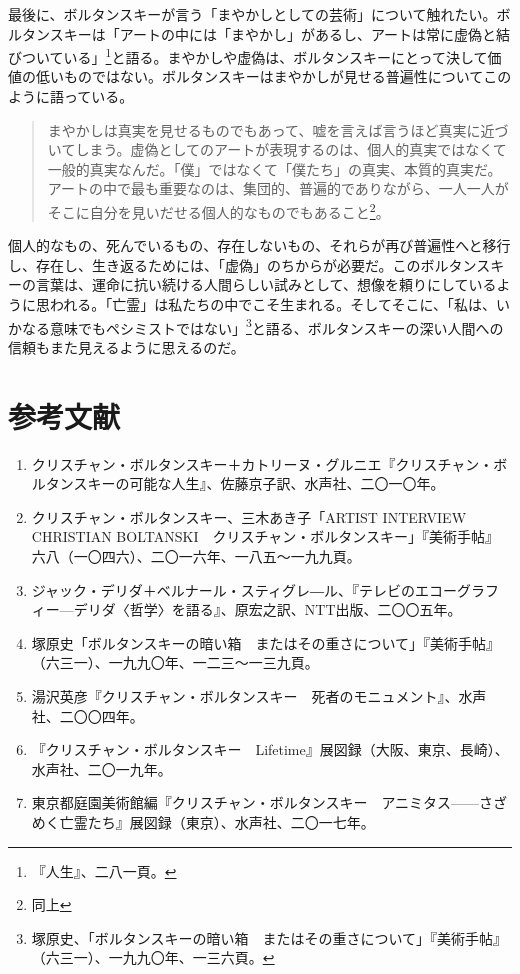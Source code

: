 \documentclass[b5j,twoside,twocolumn]{utarticle}
\begin{document}
最後に、ボルタンスキーが言う「まやかしとしての芸術」について触れたい。ボルタンスキーは「アートの中には「まやかし」があるし、アートは常に虚偽と結びついている」\footnote{『人生』、二八一頁。}と語る。まやかしや虚偽は、ボルタンスキーにとって決して価値の低いものではない。ボルタンスキーはまやかしが見せる普遍性についてこのように語っている。
\begin{quote}
まやかしは真実を見せるものでもあって、嘘を言えば言うほど真実に近づいてしまう。虚偽としてのアートが表現するのは、個人的真実ではなくて一般的真実なんだ。「僕」ではなくて「僕たち」の真実、本質的真実だ。アートの中で最も重要なのは、集団的、普遍的でありながら、一人一人がそこに自分を見いだせる個人的なものでもあること\footnote{同上}。
\end{quote}


個人的なもの、死んでいるもの、存在しないもの、それらが再び普遍性へと移行し、存在し、生き返るためには、「虚偽」のちからが必要だ。このボルタンスキーの言葉は、運命に抗い続ける人間らしい試みとして、想像を頼りにしているように思われる。「亡霊」は私たちの中でこそ生まれる。そしてそこに、「私は、いかなる意味でもペシミストではない」\footnote{塚原史、「ボルタンスキーの暗い箱　またはその重さについて」『美術手帖』（六三一）、一九九〇年、一三六頁。}と語る、ボルタンスキーの深い人間への信頼もまた見えるように思えるのだ。

\clearpage
{\small
\section*{参考文献}
\renewcommand{\labelenumi}{\pbox<y>{[\arabic{enumi}]}}
\begin{enumerate}
\item クリスチャン・ボルタンスキー＋カトリーヌ・グルニエ『クリスチャン・ボルタンスキーの可能な人生』、佐藤京子訳、水声社、二〇一〇年。
\item クリスチャン・ボルタンスキー、三木あき子「ARTIST INTERVIEW CHRISTIAN BOLTANSKI　クリスチャン・ボルタンスキー」『美術手帖』六八（一〇四六）、二〇一六年、一八五～一九九頁。
\item ジャック・デリダ＋ベルナール・スティグレ―ル、『テレビのエコーグラフィー—デリダ〈哲学〉を語る』、原宏之訳、NTT出版、二〇〇五年。
\item 塚原史「ボルタンスキーの暗い箱　またはその重さについて」『美術手帖』（六三一）、一九九〇年、一二三～一三九頁。
\item 湯沢英彦『クリスチャン・ボルタンスキー　死者のモニュメント』、水声社、二〇〇四年。
\item 『クリスチャン・ボルタンスキー　Lifetime』展図録（大阪、東京、長崎）、水声社、二〇一九年。
\item 東京都庭園美術館編『クリスチャン・ボルタンスキー　アニミタス------さざめく亡霊たち』展図録（東京）、水声社、二〇一七年。
\end{enumerate}
}
\end{document}
